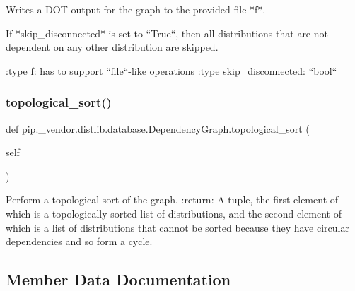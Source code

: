 \begin{DoxyVerb}Writes a DOT output for the graph to the provided file *f*.

If *skip_disconnected* is set to ``True``, then all distributions
that are not dependent on any other distribution are skipped.

:type f: has to support ``file``-like operations
:type skip_disconnected: ``bool``
\end{DoxyVerb}
 \mbox{\label{classpip_1_1__vendor_1_1distlib_1_1database_1_1DependencyGraph_af79cfdb1bc73ef831fb4e05affd7af7b}} 
\subsubsection{\texorpdfstring{topological\+\_\+sort()}{topological\_sort()}}
{\footnotesize\ttfamily def pip.\+\_\+vendor.\+distlib.\+database.\+Dependency\+Graph.\+topological\+\_\+sort (\begin{DoxyParamCaption}\item[{}]{self }\end{DoxyParamCaption})}

\begin{DoxyVerb}Perform a topological sort of the graph.
:return: A tuple, the first element of which is a topologically sorted
 list of distributions, and the second element of which is a
 list of distributions that cannot be sorted because they have
 circular dependencies and so form a cycle.
\end{DoxyVerb}
 

\subsection{Member Data Documentation}
\mbox{\label{classpip_1_1__vendor_1_1distlib_1_1database_1_1DependencyGraph_ab09458adced85d979e12319d4a76a80e}} 
